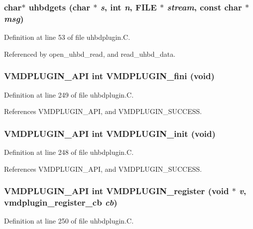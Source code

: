 \subsubsection{\setlength{\rightskip}{0pt plus 5cm}char$\ast$ uhbdgets (char $\ast$ {\em s}, int {\em n}, FILE $\ast$ {\em stream}, const char $\ast$ {\em msg})\hspace{0.3cm}{\tt  [static]}}\label{uhbdplugin_8C_a2}




Definition at line 53 of file uhbdplugin.C.

Referenced by open\_\-uhbd\_\-read, and read\_\-uhbd\_\-data.
\subsubsection{\setlength{\rightskip}{0pt plus 5cm}VMDPLUGIN\_\-API int VMDPLUGIN\_\-fini (void)}\label{uhbdplugin_8C_a8}




Definition at line 249 of file uhbdplugin.C.

References VMDPLUGIN\_\-API, and VMDPLUGIN\_\-SUCCESS.
\subsubsection{\setlength{\rightskip}{0pt plus 5cm}VMDPLUGIN\_\-API int VMDPLUGIN\_\-init (void)}\label{uhbdplugin_8C_a7}




Definition at line 248 of file uhbdplugin.C.

References VMDPLUGIN\_\-API, and VMDPLUGIN\_\-SUCCESS.
\subsubsection{\setlength{\rightskip}{0pt plus 5cm}VMDPLUGIN\_\-API int VMDPLUGIN\_\-register (void $\ast$ {\em v}, {\bf vmdplugin\_\-register\_\-cb} {\em cb})}\label{uhbdplugin_8C_a9}




Definition at line 250 of file uhbdplugin.C.

